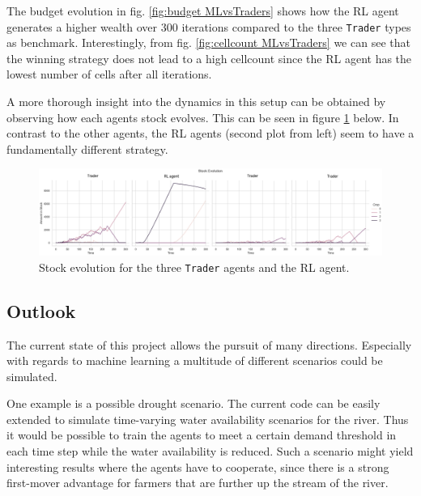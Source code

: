 \documentclass[a4paper,12pt]{article} %
\begin{document}
The budget evolution in fig. \ref{fig:budget MLvsTraders} shows how the RL agent generates a higher wealth over 300 iterations compared to the three \texttt{Trader} types as benchmark. Interestingly, from fig. \ref{fig:cellcount MLvsTraders} we can see that the winning strategy does not lead to a high cellcount since the RL agent has the lowest number of cells after all iterations.

A more thorough insight into the dynamics in this setup can be obtained by observing how each agents stock evolves.
This can be seen in figure \ref{fig:stock evolve} below. In contrast to the other agents, the RL agents (second plot from left) seem to have a fundamentally different strategy. 

\begin{figure}[H]
    \centering
    \includegraphics[width = 1\textwidth]{Figures/stock evolution.PNG}
    \caption{Stock evolution for the three \texttt{Trader} agents and the RL agent.}
    \label{fig:stock evolve}
\end{figure}





\newpage
\subsection{Outlook}
The current state of this project allows the pursuit of many directions. Especially with regards to machine learning a multitude of different scenarios could be simulated.

One example is a possible drought scenario. The current code can be easily extended to simulate time-varying water availability scenarios for the river. Thus it would be possible to train the agents to meet a certain demand threshold in each time step while the water availability is reduced. Such a scenario might yield interesting results where the agents have to cooperate, since there is a strong first-mover advantage for farmers that are further up the stream of the river.
\end{document}
